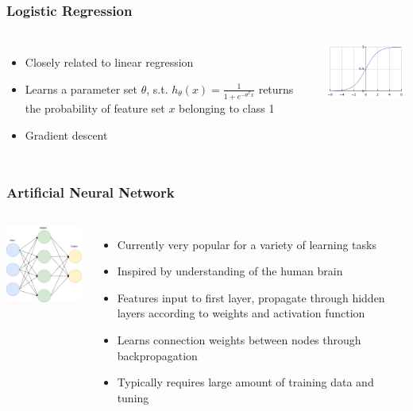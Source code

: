 \documentclass{beamer}
\begin{document}
\begin{frame}
\frametitle{Logistic Regression}
\begin{columns}
  \begin{itemize}
    \item Closely related to linear regression
    \item Learns a parameter set $\theta$, s.t. $h_\theta(x) = \frac{1}{1+e^{-\theta^Tx}}$ returns the probability of feature set $x$ belonging to class 1
    \item Gradient descent
  \end{itemize}
  \includegraphics[width = 5cm]{Figures/logit}
\end{columns}
\end{frame}


\begin{frame}
\frametitle{Artificial Neural Network}
\begin{columns}
\includegraphics[width = 4.5cm]{Figures/NN}
\begin{itemize}
  \item Currently very popular for a variety of learning tasks
  \item Inspired by understanding of the human brain
  \item Features input to first layer, propagate through hidden layers according to weights and activation function
  \item Learns connection weights between nodes through backpropagation
  \item Typically requires large amount of training data and tuning
\end{itemize}
\end{columns}
\end{frame}
\end{document}
